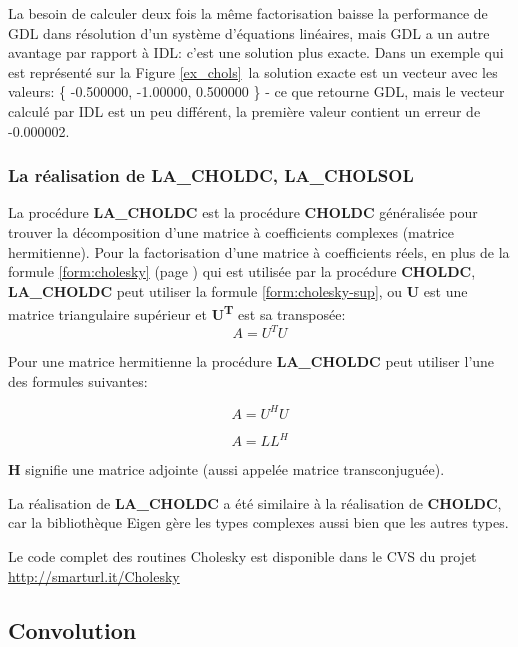 La besoin de calculer deux fois la même factorisation baisse la performance de
GDL  dans résolution d'un système d'équations linéaires, mais GDL a un autre avantage par rapport à IDL: c'est une solution plus exacte. Dans un exemple qui est représenté sur la Figure \ref{ex_chols}\ la solution exacte est un vecteur avec les valeurs: \{ -0.500000, -1.00000, 0.500000 \} - ce que retourne GDL, mais le vecteur calculé par IDL est un peu différent, la première valeur contient un erreur de -0.000002.

\subsubsection{La réalisation de LA\_CHOLDC, LA\_CHOLSOL}

La procédure \textbf{LA\_CHOLDC} est la procédure \textbf{CHOLDC} généralisée
pour trouver la décomposition d'une matrice à coefficients complexes (matrice hermitienne). Pour la factorisation d'une matrice à coefficients réels, en plus de la formule \eqref{form:cholesky} (page \pageref{form:cholesky}) qui est utilisée par la procédure \textbf{CHOLDC}, \textbf{LA\_CHOLDC} peut utiliser la formule \eqref{form:cholesky-sup}, ou \textbf{U} est une matrice triangulaire supérieur et \textbf{U\textsuperscript{T}} est sa transposée:
\begin{equation}
	A=U^TU
  	\label{form:cholesky-sup}
\end{equation}

Pour une matrice hermitienne la procédure \textbf{LA\_CHOLDC} peut utiliser l'une des formules suivantes:

 \begin{equation}
	A=U^HU
  	\label{form:cholesky-com-sup}
\end{equation}

 \begin{equation}
	A=LL^H
  	\label{form:cholesky-com}
\end{equation}

\textbf{H} signifie une matrice adjointe (aussi appelée matrice transconjuguée).

La réalisation de \textbf{LA\_CHOLDC} a été similaire à la réalisation de
\textbf{CHOLDC}, car la bibliothèque Eigen gère les types complexes aussi bien que les autres types.

Le code complet des routines Cholesky est disponible dans le CVS du projet \url{http://smarturl.it/Cholesky}

\subsection{Convolution}
